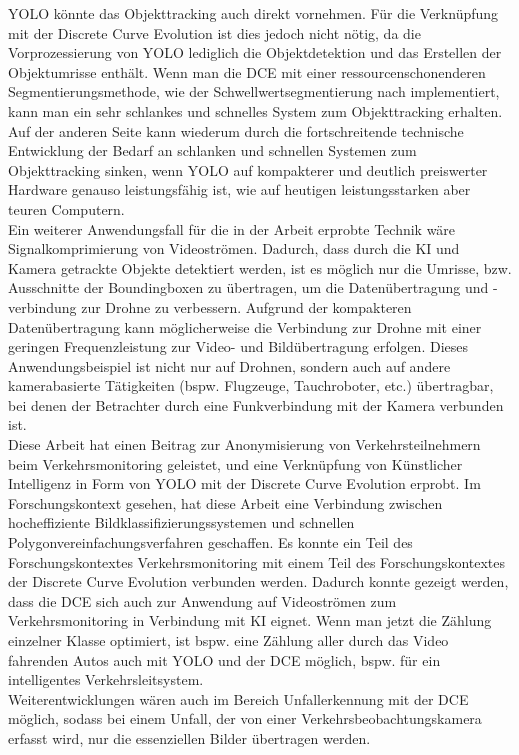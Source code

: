 {{	YOLO könnte das Objekttracking auch direkt vornehmen. Für die Verknüpfung mit der Discrete Curve Evolution ist dies jedoch nicht nötig, da die Vorprozessierung von YOLO lediglich die Objektdetektion und das Erstellen der Objektumrisse enthält. Wenn man die DCE mit einer ressourcenschonenderen Segmentierungsmethode, wie der Schwellwertsegmentierung nach \citeauthor{Otsu1979} \cite{Otsu1979} implementiert, kann man ein sehr schlankes und schnelles System zum Objekttracking erhalten. \\
	Auf der anderen Seite kann wiederum durch die fortschreitende technische Entwicklung der Bedarf an schlanken und schnellen Systemen zum Objekttracking sinken, wenn YOLO auf kompakterer und deutlich preiswerter Hardware genauso leistungsfähig ist, wie auf heutigen leistungsstarken aber teuren Computern. \\


	Ein weiterer Anwendungsfall für die in der Arbeit erprobte Technik wäre Signalkomprimierung von Videoströmen. Dadurch, dass durch die KI und Kamera getrackte Objekte detektiert werden, ist es möglich nur die Umrisse, bzw. Ausschnitte der Boundingboxen zu übertragen, um die Datenübertragung und -verbindung zur Drohne zu verbessern. Aufgrund der kompakteren Datenübertragung kann möglicherweise die Verbindung zur Drohne mit einer geringen Frequenzleistung zur Video- und Bildübertragung erfolgen. Dieses Anwendungsbeispiel ist nicht nur auf Drohnen, sondern auch auf andere kamerabasierte Tätigkeiten (bspw. Flugzeuge, Tauchroboter, etc.) übertragbar, bei denen der Betrachter durch eine Funkverbindung mit der Kamera verbunden ist.\\



	Diese Arbeit hat einen Beitrag zur Anonymisierung von Verkehrsteilnehmern beim Verkehrsmonitoring geleistet, und eine Verknüpfung von Künstlicher Intelligenz in Form von YOLO mit der Discrete Curve Evolution erprobt. Im Forschungskontext gesehen, hat diese Arbeit eine Verbindung zwischen hocheffiziente Bildklassifizierungssystemen und schnellen Polygonvereinfachungsverfahren geschaffen. Es konnte ein Teil des Forschungskontextes Verkehrsmonitoring mit einem Teil des Forschungskontextes der Discrete Curve Evolution verbunden werden. Dadurch konnte gezeigt werden, dass die DCE sich auch zur Anwendung auf Videoströmen zum Verkehrsmonitoring in Verbindung mit KI eignet. Wenn man jetzt  die Zählung einzelner Klasse optimiert, ist bspw. eine Zählung aller durch das Video fahrenden Autos auch mit YOLO und der DCE möglich, bspw. für ein intelligentes Verkehrsleitsystem. \\
	Weiterentwicklungen wären auch im Bereich Unfallerkennung mit der DCE möglich, sodass bei einem Unfall, der von einer Verkehrsbeobachtungskamera erfasst wird, nur die essenziellen Bilder übertragen werden. 



	
	}

}



